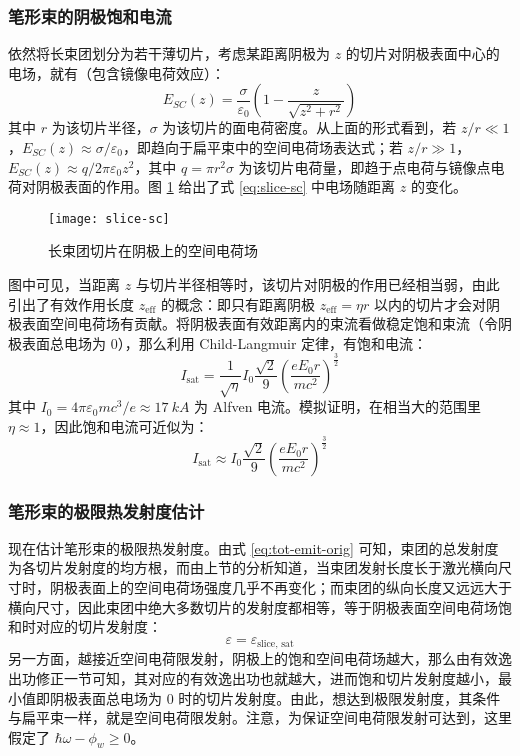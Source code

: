 \subsubsection{笔形束的阴极饱和电流}
依然将长束团划分为若干薄切片，考虑某距离阴极为 $z$ 的切片对阴极表面中心的电场，就有（包含镜像电荷效应）：
\begin{equation}
E_{SC}(z) = \frac{\sigma}{\varepsilon_0}\left(1-\frac{z}{\sqrt{z^2+r^2}}\right)
\label{eq:slice-sc}
\end{equation}
其中 $r$ 为该切片半径，$\sigma$ 为该切片的面电荷密度。从上面的形式看到，若 $z/r \ll 1$，$E_{SC}(z)\approx \sigma/\varepsilon_0$，即趋向于扁平束中的空间电荷场表达式；若 $z/r \gg 1$，$E_{SC}(z)\approx q/2\pi\varepsilon_0z^2$，其中 $q = \pi r^2 \sigma$ 为该切片电荷量，即趋于点电荷与镜像点电荷对阴极表面的作用。图 \ref{fig:slice-sc} 给出了式 \ref{eq:slice-sc} 中电场随距离 $z$ 的变化。
\begin{figure}[htbp]
\centering
\texttt{[image: slice-sc]}
\caption{\label{fig:slice-sc} 长束团切片在阴极上的空间电荷场}
\end{figure}
图中可见，当距离 $z$ 与切片半径相等时，该切片对阴极的作用已经相当弱，由此引出了有效作用长度 $z_{\text{eff}}$ 的概念：即只有距离阴极 $z_{\text{eff}}=\eta r$ 以内的切片才会对阴极表面空间电荷场有贡献。将阴极表面有效距离内的束流看做稳定饱和束流（令阴极表面总电场为 0），那么利用 Child-Langmuir 定律，有饱和电流：
\begin{equation}
I_{\text{sat}} = \frac{1}{\sqrt{\eta}}I_0\frac{\sqrt{2}}{9}\left(\frac{eE_0r}{mc^2}\right)^{\frac{3}{2}}
\end{equation}
其中 $I_0=4\pi\varepsilon_0mc^3/e\approx\SI{17}{kA}$ 为 Alfven 电流。模拟证明，在相当大的范围里 $\eta\approx 1$，因此饱和电流可近似为：
\begin{equation}
I_{\text{sat}} \approx I_0\frac{\sqrt{2}}{9}\left(\frac{eE_0r}{mc^2}\right)^{\frac{3}{2}}
\label{eq:sat-I}
\end{equation}

\subsubsection{笔形束的极限热发射度估计}
现在估计笔形束的极限热发射度。由式 \ref{eq:tot-emit-orig} 可知，束团的总发射度为各切片发射度的均方根，而由上节的分析知道，当束团发射长度长于激光横向尺寸时，阴极表面上的空间电荷场强度几乎不再变化；而束团的纵向长度又远远大于横向尺寸，因此束团中绝大多数切片的发射度都相等，等于阴极表面空间电荷场饱和时对应的切片发射度：
\begin{equation}
\varepsilon = \varepsilon_{\text{slice, sat}}
\end{equation}
另一方面，越接近空间电荷限发射，阴极上的饱和空间电荷场越大，那么由有效逸出功修正一节可知，其对应的有效逸出功也就越大，进而饱和切片发射度越小，最小值即阴极表面总电场为 0 时的切片发射度。由此，想达到极限发射度，其条件与扁平束一样，就是空间电荷限发射。注意，为保证空间电荷限发射可达到，这里假定了 $\hbar\omega-\phi_w \ge 0$。

